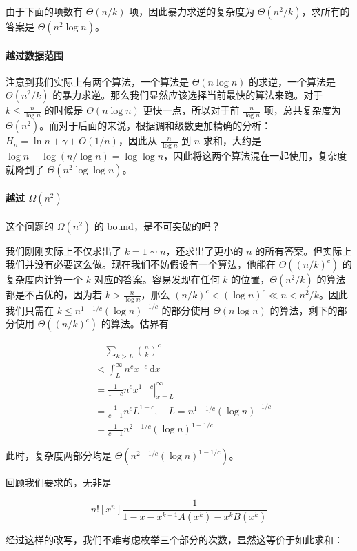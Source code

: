 \documentclass[12pt]{ctexart}
\theoremstyle{theorem}
\theoremstyle{theorem}
\begin{document}
由于下面的项数有 $\Theta(n/k)$ 项，因此暴力求逆的复杂度为 $\Theta(n^2/k)$，求所有的答案是 $\Theta(n^2\log n)$。

\paragraph{越过数据范围}

注意到我们实际上有两个算法，一个算法是 $\Theta(n\log n)$ 的求逆，一个算法是 $\Theta(n^2/k)$ 的暴力求逆。那么我们显然应该选择当前最快的算法来跑。对于 $k\le \frac n{\log n}$ 的时候是 $\Theta(n\log n)$ 更快一点，所以对于前 $\frac n{\log n}$ 项，总共复杂度为 $\Theta(n^2)$。而对于后面的来说，根据调和级数更加精确的分析：$H_n = \ln n + \gamma + O(1/n)$，因此从 $\frac n{\log n}$ 到 $n$ 求和，大约是 $\log n - \log(n/\log n) = \log\log n$，因此将这两个算法混在一起使用，复杂度就降到了 $\Theta(n^2\log\log n)$。

\paragraph{越过 $\Omega(n^2)$}

这个问题的 $\Omega(n^2)$ 的 bound，是不可突破的吗？

我们刚刚实际上不仅求出了 $k=1\sim n$，还求出了更小的 $n$ 的所有答案。但实际上我们并没有必要这么做。现在我们不妨假设有一个算法，他能在 $\Theta((n/k)^c)$ 的复杂度内计算一个 $k$ 对应的答案。容易发现在任何 $k$ 的位置，$\Theta(n^2/k)$ 的算法都是不占优的，因为若 $k>\frac n{\log n}$，那么 $(n/k)^c < (\log n)^c \ll n < n^2/k$。因此我们只需在 $k\le n^{1-1/c}(\log n)^{-1/c}$ 的部分使用 $\Theta(n\log n)$ 的算法，剩下的部分使用 $\Theta((n/k)^c)$ 的算法。估界有

$$
\begin{aligned}
&\quad \sum_{k>L} \left(\frac nk\right)^c\\
&< \int_L^\infty n^cx^{-c} \,\mathrm dx\\
&= \left.\frac 1{1-c}n^c x^{1-c}\right|_{x=L}^\infty\\
&= \frac 1{c-1}n^cL^{1-c},\quad L=n^{1-1/c}(\log n)^{-1/c}\\
&= \frac 1{c-1} n^{2-1/c}(\log n)^{1-1/c}
\end{aligned}
$$

此时，复杂度两部分均是 $\Theta(n^{2-1/c}(\log n)^{1-1/c})$。

回顾我们要求的，无非是

$$
n![x^n] \frac 1{1-x-x^{k+1}A(x^k)-x^kB(x^k)}
$$

经过这样的改写，我们不难考虑枚举三个部分的次数，显然这等价于如此求和：
\end{document}
